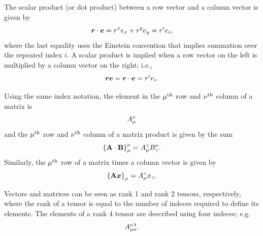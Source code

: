 The scalar product (or dot product) between
a row vector and a column vector is given by
%
\begin{equation}
	\mbox{\boldmath $r$} \cdot \mbox{\boldmath $e$} = r^x e_x + r^y e_y = r^i e_i ,
	\label{eqn:scalar_product}
\end{equation}
%
where the last equality uses the Einstein convention that implies summation over the repeated index $i$.
%
A scalar product is implied when a row vector on the left
is multiplied by a column vector on the right; i.e.,
%
\begin{equation}
	\mbox{\boldmath $r$} \mbox{\boldmath $e$} = \mbox{\boldmath $r$} \cdot \mbox{\boldmath $e$} = r^i e_i .
	\label{eqn:implicit_scalar_product}
\end{equation}
%

Using the same index notation, the element in the $\mu^\mathrm{th}$ row and
$\nu^\mathrm{th}$ column of a matrix  is
%
\begin{equation}
	A_\mu^\nu
\end{equation}
%
and the $\mu^\mathrm{th}$ row and
$\nu^\mathrm{th}$ column of a matrix product is given by the sum
%
\begin{equation}
\left\{ {\bf A} \cdot {\bf B} \right\}_\mu^\nu 
 = A_\mu^\gamma B_\gamma^\nu.
	\label{eqn:matrix_product}
\end{equation}
%
Similarly, the $\mu^\mathrm{th}$ row of a matrix times a column vector 
is given by
%
\begin{equation}
\left\{ {\bf A} \mbox{\boldmath $x$} \right\}_\mu
 = A_\mu^\gamma x_\gamma.
	\label{eqn:matrix_times_vector}
\end{equation}

Vectors and matrices can be seen as rank 1 and rank 2 tensors, respectively, where the rank of a tensor is equal to the number of indeces required to define its elements.  
%
%
The elements of a rank 4 tensor are described using four indeces; e.g.
\begin{equation}
	A_{\mu\kappa}^{\nu\lambda}.
\end{equation}

